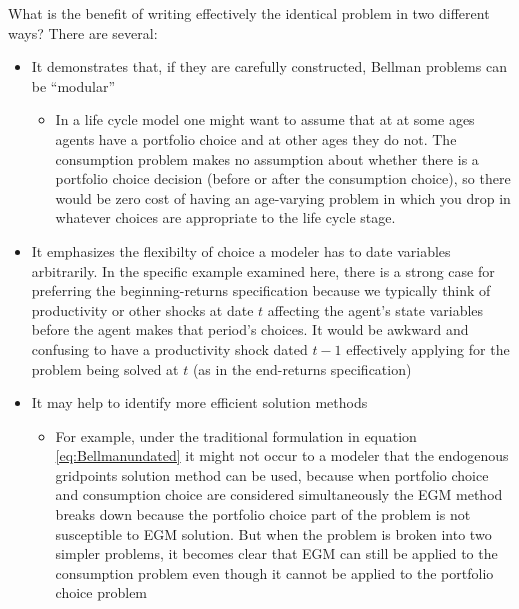 \documentclass[titlepage, headings=optiontotocandhead]{econtex}
\begin{document}
What is the benefit of writing effectively the identical problem in two different ways?  There are several:
\begin{itemize}
\item It demonstrates that, if they are carefully constructed, Bellman problems can be ``modular''
  \begin{itemize}
  \item In a life cycle model one might want to assume that at at some ages agents have a portfolio choice and at other ages they do not. The consumption problem makes no assumption about whether there is a portfolio choice decision (before or after the consumption choice), so there would be zero cost of having an age-varying problem in which you drop in whatever choices are appropriate to the life cycle stage.
  \end{itemize}
\item It emphasizes the flexibilty of choice a modeler has to date variables arbitrarily.  In the specific example examined here, there is a strong case for preferring the beginning-returns specification because we typically think of productivity or other shocks at date $t$ affecting the agent's state variables before the agent makes that period's choices.  It would be awkward and confusing to have a productivity shock dated $t-1$ effectively applying for the problem being solved at $t$ (as in the end-returns specification)
\item It may help to identify more efficient solution methods
  \begin{itemize}
  \item For example, under the traditional formulation in equation \eqref{eq:Bellmanundated} it might not occur to a modeler that the endogenous gridpoints solution method can be used, because when portfolio choice and consumption choice are considered simultaneously the EGM method breaks down because the portfolio choice part of the problem is not susceptible to EGM solution.  But when the problem is broken into two simpler problems, it becomes clear that EGM can still be applied to the consumption problem even though it cannot be applied to the portfolio choice problem
  \end{itemize}
\end{itemize}

\end{document}
